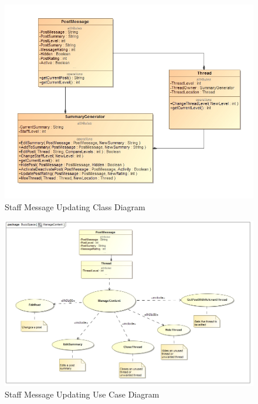 \documentclass[11pt]{article}
\begin{document}
\begin{enumerate}
\begin{itemize}
 \graphicspath{ {../Diagrams/Andrew/} }
	\begin{figure}[H]		
		\includegraphics[scale=0.5,center]{B2ClassDiagram.png}
		\caption{Staff Message Updating Class Diagram}
	\end{figure}
	\begin{figure}[H]	
		\includegraphics[scale=0.5,center]{B2UseCase.png}
		\caption{Staff Message Updating Use Case Diagram}
	\end{figure}
	\begin{figure}[H]		

\end{figure}
\end{itemize}
\end{enumerate}
\end{document}
